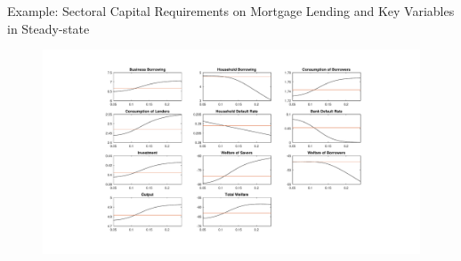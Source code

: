 \documentclass[8pt,aspectratio=169]{beamer}
\numberwithin{equation}{section}
\begin{document}
\begin{frame}{Example: Sectoral Capital Requirements on Mortgage Lending and Key Variables in Steady-state}

\begin{figure}[H]
\centering
\includegraphics[scale=0.3]{WA_SCR_housing_level.pdf}\\

\end{figure}

\end{frame}




\end{document}
